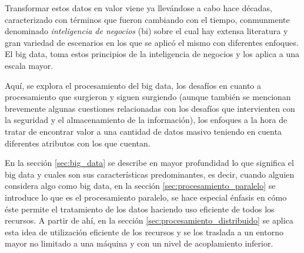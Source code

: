 Transformar estos datos en valor viene ya llevándose a cabo hace décadas,
caracterizado con términos que fueron cambiando con el tiempo, conmunmente denominado
\textit{inteligencia de negocios} (\acrshort{bi}) sobre el cual hay extensa literatura y
gran variedad de escenarios en los que se aplicó el mismo con diferentes
enfoques\cites{britos2008, qazi2014, su2021, khozium2020, vaclav2021, phillips-wren2021, schwade2021}.
El big data, toma estos principios de la inteligencia de negocios y los aplica a una escala mayor.

Aquí, se explora el procesamiento del big data, los desafíos
en cuanto a procesamiento que surgieron y siguen surgiendo (aunque
también se mencionan brevemente algunas cuestiones relacionadas con los
desafíos que intervienten con la seguridad y el almacenamiento de la
información), los enfoques a la hora de tratar de encontrar valor a una
cantidad de datos masivo teniendo en cuenta diferentes atributos con los que
cuentan. 


En la sección \ref{sec:big_data} se describe en mayor profundidad lo que
significa el big data y cuales son sus características predominantes, es decir,
cuando alguien considera algo como big data, en la sección \ref{sec:procesamiento_paralelo} se
introduce lo que es el procesamiento paralelo, se hace especial énfasis
en cómo éste permite el tratamiento de los datos haciendo uso eficiente
de todos los recursos. A partir de ahí, en la sección 
\ref{sec:procesamiento_distribuido} se aplica esta idea de utilización
eficiente de los recursos y se los traslada a
un entorno mayor no limitado a una máquina y con un nivel de acoplamiento
inferior.

